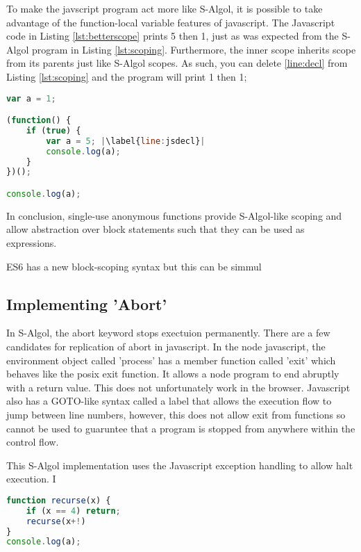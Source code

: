 \documentclass{article}
\begin{document}
To make the javscript program act more like S-Algol, it is possible to take advantage of the function-local variable features of javascript. The Javascript code in Listing \ref{lst:betterscope} prints 5 then 1, just as was expected from the S-Algol program in Listing \ref{lst:scoping}. Furthermore, the inner scope inherits scope from its parents just like S-Algol scopes. As such, you can delete \ref{line:decl} from Listing \ref{lst:scoping} and the program will print 1 then 1;

\begin{lstlisting}[caption={S-Algol-like Javascript scoping},label={lst:betterscope}, language=javascript, escapechar="|"]
var a = 1;

(function() {
	if (true) {
		var a = 5; |\label{line:jsdecl}|
		console.log(a);
	}
})();

console.log(a);
\end{lstlisting}

In conclusion, single-use anonymous functions provide S-Algol-like scoping and allow abstraction over block statements such that they can be used as expressions.


ES6 has a new block-scoping syntax but this can be simmul


\subsection{Implementing 'Abort'}

In S-Algol, the abort keyword stops exectuion permanently. There are a few candidates for replication of abort in javascript. In the node javascript, the environment object called 'process' has a member function called 'exit' which behaves like the posix exit function. It allows a node program to end abruptly with a return value. This does not unfortunately work in the browser. Javascript also has a GOTO-like syntax called a label that allows the execution flow to jump between line numbers, however, this does not allow exit from functions so cannot be used to guaruntee that a program is stopped from anywhere within the control flow.

This S-Algol implementation uses the Javascript exception handling to allow halt execution. I

\begin{lstlisting}[caption={S-Algol-like Javascript scoping},label={lst:betterscope}, language=javascript, escapechar="|"]
function recurse(x) {
	if (x == 4) return;
	recurse(x+!)
}
console.log(a);
\end{lstlisting}
\end{document}
